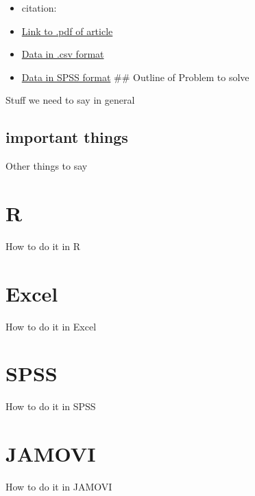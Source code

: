 \documentclass[]{book}
\providecommand{\tightlist}{%
  \setlength{\itemsep}{0pt}\setlength{\parskip}{0pt}}
\theoremstyle{definition}
\theoremstyle{definition}
\theoremstyle{definition}
\theoremstyle{remark}
\begin{document}
\begin{itemize}
\tightlist
\item
  citation:
\item
  \href{}{Link to .pdf of article}
\item
  \href{}{Data in .csv format}
\item
  \href{}{Data in SPSS format} \#\# Outline of Problem to solve
\end{itemize}

Stuff we need to say in general

\subsection{important things}\label{important-things-5}

Other things to say

\section{R}\label{r-11}

How to do it in R

\section{Excel}\label{excel-10}

How to do it in Excel

\section{SPSS}\label{spss-10}

How to do it in SPSS

\section{JAMOVI}\label{jamovi-10}

How to do it in JAMOVI


\end{document}

